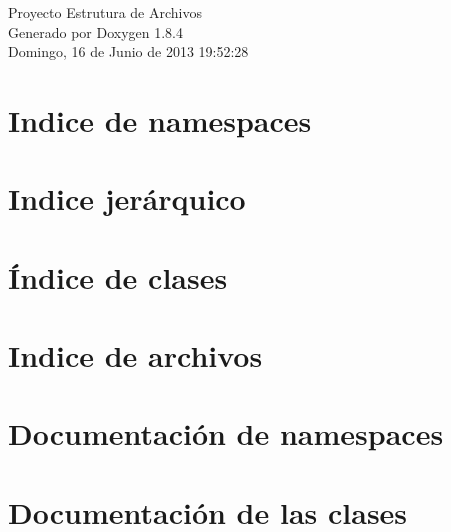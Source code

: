 \documentclass[twoside]{book}
\newcommand{\clearemptydoublepage}{%
  \newpage{\pagestyle{empty}\cleardoublepage}%
}
\begin{document}
\hypersetup{pageanchor=false}
\begin{titlepage}
\vspace*{7cm}
\begin{center}%
{\Large Proyecto Estrutura de Archivos }\\
\vspace*{1cm}
{\large Generado por Doxygen 1.8.4}\\
\vspace*{0.5cm}
{\small Domingo, 16 de Junio de 2013 19:52:28}\\
\end{center}
\end{titlepage}
\clearemptydoublepage
\tableofcontents
\clearemptydoublepage
{}
\hypersetup{pageanchor=true}

\chapter{Indice de namespaces}

\chapter{Indice jerárquico}

\chapter{Índice de clases}

\chapter{Indice de archivos}

\chapter{Documentación de namespaces}

\chapter{Documentación de las clases}



























\end{document}
